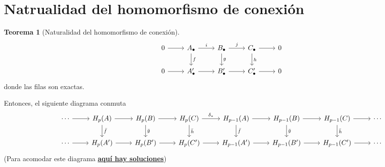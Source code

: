 \documentclass{book}
\theoremstyle{definition}
\newtheorem*{teo}{Teorema}
\begin{document}
\section{Natrualidad del homomorfismo de conexión}
\begin{teo}[Naturalidad del homomorfismo de conexión]
	\[\begin{tikzcd}
		&0\arrow{r}&A_\bullet\arrow{r}{i}\arrow{d}{f}&B_\bullet\arrow{r}{j}\arrow{d}{g}&C_\bullet\arrow{r}\arrow{d}{h}&0\\
		&0\arrow{r}&A'_\bullet\arrow{r}&B'_\bullet\arrow{r}&C'_\bullet\arrow{r}&0
	\end{tikzcd}\]
	donde las filas son exactas.\par
	Entonces, el siguiente diagrama conmuta
		\[\begin{tikzcd}
		&\cdots\arrow{r}&H_p(A)\arrow{r}\arrow{d}{\bar f}&H_p(B)\arrow{r}\arrow{d}{\bar g}&H_p(C)\arrow{r}{\delta_*}\arrow{d}{\bar h}&H_{p-1}(A)\arrow{r}\arrow{d}{\bar f}&H_{p-1}(B)\arrow{r}\arrow{d}{\bar g}&H_{p-1}(C)\arrow{r}\arrow{d}{\bar h}&\cdots\\
		&\cdots\arrow{r}&H_p(A')\arrow{r}&H_p(B')\arrow{r}&H_p(C')\arrow{r}&H_{p-1}(A')\arrow{r}&H_{p-1}(B')\arrow{r}&H_{p-1}(C')\arrow{r}&\cdots
		\end{tikzcd}\]
		(Para acomodar este diagrama \href{https://tex.stackexchange.com/questions/663056/wide-tikz-cd-diagram-not-centered-shifted-to-the-right}{\textbf{aquí hay soluciones}})
\end{teo}

	
\end{document}
